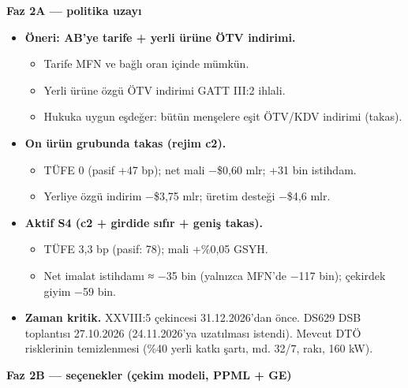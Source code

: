 \textbf{Faz 2A --- politika uzayı}

\begin{itemize}
\tightlist
\item
  \textbf{Öneri: AB'ye tarife + yerli ürüne ÖTV indirimi.}

  \begin{itemize}
  \tightlist
  \item
    Tarife MFN ve bağlı oran içinde mümkün.
  \item
    Yerli ürüne özgü ÖTV indirimi GATT III:2 ihlali.
  \item
    Hukuka uygun eşdeğer: bütün menşelere eşit ÖTV/KDV indirimi (takas).
  \end{itemize}
\item
  \textbf{On ürün grubunda takas (rejim c2).}

  \begin{itemize}
  \tightlist
  \item
    TÜFE 0 (pasif +47 bp); net mali −\$0,60 mlr; +31 bin istihdam.
  \item
    Yerliye özgü indirim −\$3,75 mlr; üretim desteği −\$4,6 mlr.
  \end{itemize}
\item
  \textbf{Aktif S4 (c2 + girdide sıfır + geniş takas).}

  \begin{itemize}
  \tightlist
  \item
    TÜFE 3,3 bp (pasif: 78); mali +\%0,05 GSYH.
  \item
    Net imalat istihdamı ≈ −35 bin (yalnızca MFN'de −117 bin); çekirdek giyim −59 bin.
  \end{itemize}
\item
  \textbf{Zaman kritik.} XXVIII:5 çekincesi 31.12.2026'dan önce. DS629 DSB toplantısı 27.10.2026 (24.11.2026'ya uzatılması istendi). Mevcut DTÖ risklerinin temizlenmesi (\%40 yerli katkı şartı, md. 32/7, rakı, 160 kW).
\end{itemize}

\textbf{Faz 2B --- seçenekler (çekim modeli, PPML + GE)}

